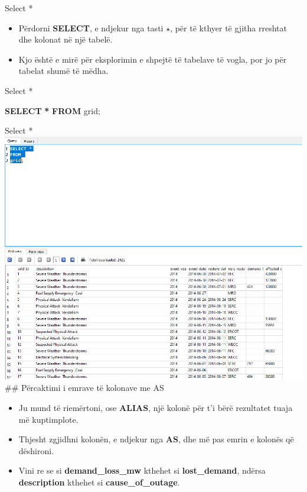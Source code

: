 \documentclass[
  ignorenonframetext,
]{beamer}
\newenvironment{Shaded}{\begin{snugshade}}{\end{snugshade}}
\newcommand{\KeywordTok}[1]{\textcolor[rgb]{0.13,0.29,0.53}{\textbf{#1}}}
\newcommand{\NormalTok}[1]{#1}
\newcommand{\OperatorTok}[1]{\textcolor[rgb]{0.81,0.36,0.00}{\textbf{#1}}}
\begin{document}
\begin{frame}{Select *}
\label{select}
\begin{itemize}
\item
  Përdorni \textbf{SELECT}, e ndjekur nga tasti \(\star\), për të kthyer
  të gjitha rreshtat dhe kolonat në një tabelë.
\item
  Kjo është e mirë për eksplorimin e shpejtë të tabelave të vogla, por
  jo për tabelat shumë të mëdha.
\end{itemize}
\end{frame}

\begin{frame}[fragile]{Select *}
\label{select-1}

\begin{Shaded}
\begin{Highlighting}[]
\KeywordTok{SELECT} \OperatorTok{*}
\KeywordTok{FROM} 
\NormalTok{grid;}
\end{Highlighting}
\end{Shaded}
\end{frame}

\begin{frame}{Select *}
\label{select-2}
\includegraphics{./Figs/sql20.png} \#\# Përcaktimi i emrave të kolonave
me AS

\begin{itemize}
\item
  Ju mund të riemërtoni, ose \textbf{ALIAS}, një kolonë për t'i bërë
  rezultatet tuaja më kuptimplote.
\item
  Thjesht zgjidhni kolonën, e ndjekur nga \textbf{AS}, dhe më pas emrin
  e kolonës që dëshironi.
\item
  Vini re se si \textbf{demand\_loss\_mw} kthehet si
  \textbf{lost\_demand}, ndërsa \textbf{description} kthehet si
  \textbf{cause\_of\_outage}.
\end{itemize}
\end{frame}
\end{document}
